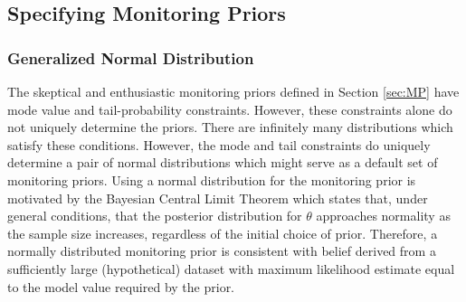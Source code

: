 \documentclass[useAMS,usenatbib,referee]{biom}
\begin{document}
\subsection{Specifying Monitoring Priors}\label{sec:mps}
\subsubsection{Generalized Normal Distribution}\label{sec:gen_normal}
The skeptical and enthusiastic monitoring priors defined in Section \ref{sec:MP} have mode value and tail-probability constraints. However, these constraints alone do not
uniquely determine the priors. There are infinitely many distributions which satisfy these conditions. However, the mode and tail constraints do uniquely determine a pair of normal 
distributions which might serve as a default set of monitoring priors. 
Using a normal distribution for the monitoring prior is motivated by the Bayesian Central Limit Theorem which states that, under general conditions, that the posterior distribution for $\theta$ approaches normality as the sample size increases, regardless of the initial choice of prior. Therefore, a normally distributed monitoring prior is consistent
with belief derived from a sufficiently large (hypothetical) dataset with maximum likelihood estimate equal to the model value required by the prior.
\end{document}
